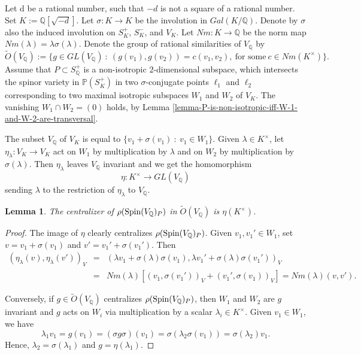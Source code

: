 \documentclass[12pt]{amsart}
\numberwithin{equation}{subsection}
\theoremstyle{plain}
\newtheorem{lem}[thm]{Lemma}
\theoremstyle{definition}
\newcommand{\QQ}{{\mathbb Q}}
\newcommand{\PP}{{\mathbb P}}
\newcommand{\cm}{\eta}
\newcommand{\Spin}{{\rm Spin}}
\begin{document}
 Let d be a rational number, such that $-d$ is not a square of a rational number. Set $K:=\QQ[\sqrt{-d}]$. 
Let $\sigma: K\rightarrow K$ be the involution in $Gal(K/\QQ)$. Denote by $\sigma$ also the induced involution on $S^+_K$, $S^-_K$, and $V_K$. 
Let $Nm:K\rightarrow\QQ$ be the norm map $Nm(\lambda)=\lambda\sigma(\lambda)$.
Denote the group of rational similarities of $V_\QQ$ by
\begin{equation}
\label{eq-group-of-similarities}
\tilde{O}(V_\QQ):=\{g\in GL(V_\QQ) \ : \ (g(v_1),g(v_2))=c(v_1,v_2), \ \mbox{for some} \ c\in Nm(K^\times)\}.
\end{equation}
Assume that $P\subset S^+_\QQ$ is a non-isotropic $2$-dimensional subspace, which intersects the spinor variety in $\PP(S^+_K)$ in two $\sigma$-conjugate points $\ell_1$ and $\ell_2$ corresponding to two maximal isotropic subspaces $W_1$ and $W_2$ of $V_K$. The vanishing $W_1\cap W_2=(0)$ holds, by Lemma \ref{lemma-P-is-non-isotropic-iff-W-1-and-W-2-are-transversal}.

The subset $V_\QQ$ of $V_K$ is equal to $\{v_1+\sigma(v_1) \ : \ v_1\in W_1\}$.
Given $\lambda\in K^\times$, let $\cm_\lambda:V_K\rightarrow V_K$ act on $W_1$ by multiplication by $\lambda$ and on $W_2$ by multiplication by $\sigma(\lambda)$. Then $\cm_\lambda$ leaves $V_\QQ$ invariant and we get the homomorphism 
\begin{equation}
\label{eq-action-by-imaginary-quadratic-number-field}
\cm:K^\times\rightarrow GL(V_\QQ)
\end{equation}
sending $\lambda$ to the restriction of $\cm_\lambda$ to $V_\QQ$.

\begin{lem}
\label{lemma-centralizer-of-rho-Spin-V-P}
The centralizer of $\rho(\Spin(V_\QQ)_P)$ in $\tilde{O}(V_\QQ)$ is $\cm(K^\times)$.
\end{lem}
 
 \begin{proof}
 The image of $\cm$ clearly centralizes $\rho(\Spin(V_\QQ)_P)$.
Given $v_1, v_1'\in W_1$, set $v=v_1+\sigma(v_1)$ and $v'=v_1'+\sigma(v_1')$. 
Then 
\begin{eqnarray*}
(\cm_\lambda(v),\cm_\lambda(v'))_V&=&(\lambda v_1+\sigma(\lambda)\sigma(v_1),\lambda v_1'+\sigma(\lambda)\sigma(v_1'))_V
\\
&=&
Nm(\lambda)\left[(v_1,\sigma(v_1'))_V+(v_1',\sigma(v_1))_V\right]
=  Nm(\lambda)(v,v').
\end{eqnarray*}

Conversely, if $g\in\tilde{O}(V_\QQ)$  centralizes $\rho(\Spin(V_\QQ)_P)$,
then $W_1$ and $W_2$ are $g$ invariant and $g$ acts on $W_i$ via multiplication by a scalar $\lambda_i\in K^\times$. Given $v_1\in W_1$, we have
\[
\lambda_1v_1=g(v_1)=(\sigma g\sigma)(v_1)=\sigma(\lambda_2\sigma(v_1))=\sigma(\lambda_2)v_1.
\]
Hence, $\lambda_2=\sigma(\lambda_1)$ and $g=\cm(\lambda_1)$.
 \end{proof}
  
\end{document}

